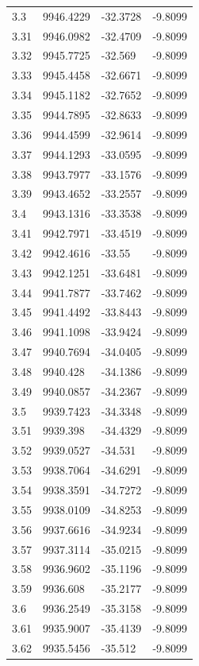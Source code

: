 \begin{table}[H]
\begin{tabular}{llll}
3.3 & 9946.4229 & -32.3728 & -9.8099 \\
3.31 & 9946.0982 & -32.4709 & -9.8099 \\
3.32 & 9945.7725 & -32.569 & -9.8099 \\
3.33 & 9945.4458 & -32.6671 & -9.8099 \\
3.34 & 9945.1182 & -32.7652 & -9.8099 \\
3.35 & 9944.7895 & -32.8633 & -9.8099 \\
3.36 & 9944.4599 & -32.9614 & -9.8099 \\
3.37 & 9944.1293 & -33.0595 & -9.8099 \\
3.38 & 9943.7977 & -33.1576 & -9.8099 \\
3.39 & 9943.4652 & -33.2557 & -9.8099 \\
3.4 & 9943.1316 & -33.3538 & -9.8099 \\
3.41 & 9942.7971 & -33.4519 & -9.8099 \\
3.42 & 9942.4616 & -33.55 & -9.8099 \\
3.43 & 9942.1251 & -33.6481 & -9.8099 \\
3.44 & 9941.7877 & -33.7462 & -9.8099 \\
3.45 & 9941.4492 & -33.8443 & -9.8099 \\
3.46 & 9941.1098 & -33.9424 & -9.8099 \\
3.47 & 9940.7694 & -34.0405 & -9.8099 \\
3.48 & 9940.428 & -34.1386 & -9.8099 \\
3.49 & 9940.0857 & -34.2367 & -9.8099 \\
3.5 & 9939.7423 & -34.3348 & -9.8099 \\
3.51 & 9939.398 & -34.4329 & -9.8099 \\
3.52 & 9939.0527 & -34.531 & -9.8099 \\
3.53 & 9938.7064 & -34.6291 & -9.8099 \\
3.54 & 9938.3591 & -34.7272 & -9.8099 \\
3.55 & 9938.0109 & -34.8253 & -9.8099 \\
3.56 & 9937.6616 & -34.9234 & -9.8099 \\
3.57 & 9937.3114 & -35.0215 & -9.8099 \\
3.58 & 9936.9602 & -35.1196 & -9.8099 \\
3.59 & 9936.608 & -35.2177 & -9.8099 \\
3.6 & 9936.2549 & -35.3158 & -9.8099 \\
3.61 & 9935.9007 & -35.4139 & -9.8099 \\
3.62 & 9935.5456 & -35.512 & -9.8099 \\

\end{tabular}
\end{table}
